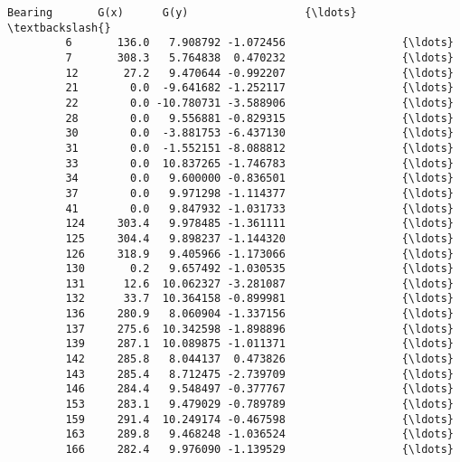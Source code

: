 \documentclass[11pt]{article}
\begin{document}
\begin{Verbatim}[commandchars=\\\{\}]
               Bearing       G(x)      G(y)                  {\ldots}                   \textbackslash{}
         6       136.0   7.908792 -1.072456                  {\ldots}                    
         7       308.3   5.764838  0.470232                  {\ldots}                    
         12       27.2   9.470644 -0.992207                  {\ldots}                    
         21        0.0  -9.641682 -1.252117                  {\ldots}                    
         22        0.0 -10.780731 -3.588906                  {\ldots}                    
         28        0.0   9.556881 -0.829315                  {\ldots}                    
         30        0.0  -3.881753 -6.437130                  {\ldots}                    
         31        0.0  -1.552151 -8.088812                  {\ldots}                    
         33        0.0  10.837265 -1.746783                  {\ldots}                    
         34        0.0   9.600000 -0.836501                  {\ldots}                    
         37        0.0   9.971298 -1.114377                  {\ldots}                    
         41        0.0   9.847932 -1.031733                  {\ldots}                    
         124     303.4   9.978485 -1.361111                  {\ldots}                    
         125     304.4   9.898237 -1.144320                  {\ldots}                    
         126     318.9   9.405966 -1.173066                  {\ldots}                    
         130       0.2   9.657492 -1.030535                  {\ldots}                    
         131      12.6  10.062327 -3.281087                  {\ldots}                    
         132      33.7  10.364158 -0.899981                  {\ldots}                    
         136     280.9   8.060904 -1.337156                  {\ldots}                    
         137     275.6  10.342598 -1.898896                  {\ldots}                    
         139     287.1  10.089875 -1.011371                  {\ldots}                    
         142     285.8   8.044137  0.473826                  {\ldots}                    
         143     285.4   8.712475 -2.739709                  {\ldots}                    
         146     284.4   9.548497 -0.377767                  {\ldots}                    
         153     283.1   9.479029 -0.789789                  {\ldots}                    
         159     291.4  10.249174 -0.467598                  {\ldots}                    
         163     289.8   9.468248 -1.036524                  {\ldots}                    
         166     282.4   9.976090 -1.139529                  {\ldots}                    

\end{Verbatim}
\end{document}
